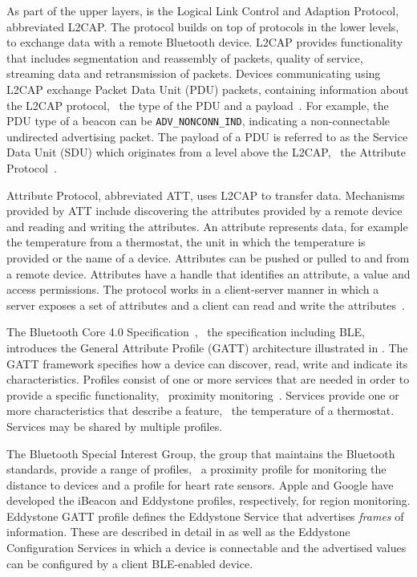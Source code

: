 As part of the upper layers, is the Logical Link Control and Adaption Protocol, abbreviated L2CAP. The protocol builds on top of protocols in the lower levels, to exchange data with a remote Bluetooth device. L2CAP provides functionality that includes segmentation and reassembly of packets, quality of service, streaming data and retransmission of packets. Devices communicating using L2CAP exchange Packet Data Unit (PDU) packets, containing information about the L2CAP protocol, \eg~the type of the PDU and a payload~\cite[pp. 80-83]{gupta2013inside}. For example, the PDU type of a beacon can be \texttt{ADV\_NONCONN\_IND}, indicating a non-connectable undirected advertising packet. The payload of a PDU is referred to as the Service Data Unit (SDU) which originates from a level above the L2CAP, \eg~the Attribute Protocol~\cite[p. 201]{gupta2013inside}.

Attribute Protocol, abbreviated ATT, uses L2CAP to transfer data. Mechanisms provided by ATT include discovering the attributes provided by a remote device and reading and writing the attributes. An attribute represents data, for example the temperature from a thermostat, the unit in which the temperature is provided or the name of a device. Attributes can be pushed or pulled to and from a remote device. Attributes have a handle that identifies an attribute, a value and access permissions. The protocol works in a client-server manner in which a server exposes a set of attributes and a client can read and write the attributes~\cite{gupta2013inside}.

The Bluetooth Core 4.0 Specification~\cite{bluetooth2010bluetooth_7_vol}, \ie~the specification including BLE, introduces the General Attribute Profile (GATT) architecture illustrated in . The GATT framework specifies how a device can discover, read, write and indicate its characteristics. Profiles consist of one or more services that are needed in order to provide a specific functionality, \eg~proximity monitoring~\cite[p. 259-261]{gupta2013inside}. Services provide one or more characteristics that describe a feature, \eg~the temperature of a thermostat. Services may be shared by multiple profiles.

The Bluetooth Special Interest Group, the group that maintains the Bluetooth standards, provide a range of profiles, \eg~a proximity profile for monitoring the distance to devices and a profile for heart rate sensors.
Apple and Google have developed the iBeacon and Eddystone profiles, respectively, for region monitoring.
Eddystone GATT profile defines the Eddystone Service that advertises \emph{frames} of information. These are described in detail in  as well as the Eddystone Configuration Services in which a device is connectable and the advertised values can be configured by a client BLE-enabled device.

